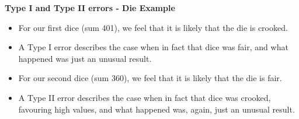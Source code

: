\documentclass[a4]{beamer}
\begin{document}

\noindent \textbf{Type I and Type II errors - Die Example}
\begin{itemize}
\item For our first dice (sum 401), we feel that it is likely that the die is crooked.
\item A Type I error describes the case when in fact that dice was fair, and what happened was just an unusual result.
\item For our second dice (sum 360), we feel that it is likely that the die is fair.
\item A Type II error describes the case when in fact that dice was crooked, favouring high values, and what happened was, again, just an unusual result.
\end{itemize}
\end{document}
